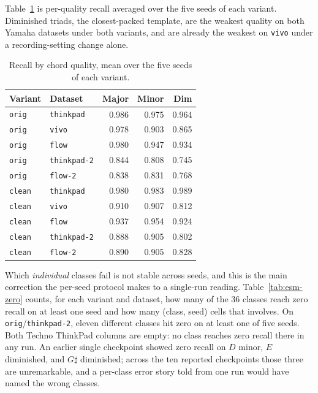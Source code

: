 \documentclass[pdflatex,sn-mathphys-num]{sn-jnl}
\begin{document}
Table~\ref{tab:esm-quality} is per-quality recall averaged over the five seeds of each variant. Diminished triads, the closest-packed template, are the weakest quality on both Yamaha datasets under both variants, and are already the weakest on \texttt{vivo} under a recording-setting change alone.

\begin{table}[t]
\caption{Recall by chord quality, mean over the five seeds of each variant.}\label{tab:esm-quality}
\setlength{\tabcolsep}{5pt}
\begin{tabular}{@{}llrrr@{}}
\toprule
Variant & Dataset & Major & Minor & Dim \\
\midrule
\texttt{orig} & \texttt{thinkpad} & 0.986 & 0.975 & 0.964 \\
\texttt{orig} & \texttt{vivo} & 0.978 & 0.903 & 0.865 \\
\texttt{orig} & \texttt{flow} & 0.980 & 0.947 & 0.934 \\
\texttt{orig} & \texttt{thinkpad-2} & 0.844 & 0.808 & 0.745 \\
\texttt{orig} & \texttt{flow-2} & 0.838 & 0.831 & 0.768 \\
\texttt{clean} & \texttt{thinkpad} & 0.980 & 0.983 & 0.989 \\
\texttt{clean} & \texttt{vivo} & 0.910 & 0.907 & 0.812 \\
\texttt{clean} & \texttt{flow} & 0.937 & 0.954 & 0.924 \\
\texttt{clean} & \texttt{thinkpad-2} & 0.888 & 0.905 & 0.802 \\
\texttt{clean} & \texttt{flow-2} & 0.890 & 0.905 & 0.828 \\
\bottomrule
\end{tabular}
\end{table}

Which \emph{individual} classes fail is not stable across seeds, and this is the main correction the per-seed protocol makes to a single-run reading. Table~\ref{tab:esm-zero} counts, for each variant and dataset, how many of the 36 classes reach zero recall on at least one seed and how many (class, seed) cells that involves. On \texttt{orig}/\texttt{thinkpad-2}, eleven different classes hit zero on at least one of five seeds. Both Techno ThinkPad columns are empty: no class reaches zero recall there in any run. An earlier single checkpoint showed zero recall on $D$ minor, $E$ diminished, and $G\sharp$ diminished; across the ten reported checkpoints those three are unremarkable, and a per-class error story told from one run would have named the wrong classes.
\end{document}
